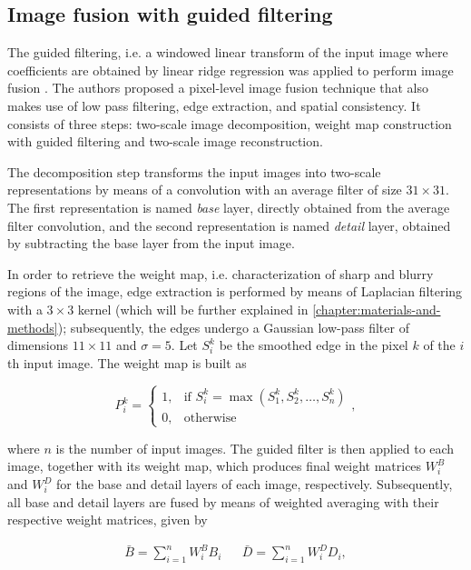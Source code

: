 \subsection{Image fusion with guided filtering}

The guided filtering, i.e. a windowed linear transform of the input image where coefficients are obtained by linear ridge regression was applied to perform image fusion \cite{li2013image}. The authors proposed a pixel-level image fusion technique that also makes use of low pass filtering, edge extraction, and spatial consistency. It consists of three steps: two-scale image decomposition, weight map construction with guided filtering and two-scale image reconstruction.

The decomposition step transforms the input images into two-scale representations by means of a convolution with an average filter of size $31 \times 31$. The first representation is named \emph{base} layer, directly obtained from the average filter convolution, and the second representation is named \emph{detail} layer, obtained by subtracting the base layer from the input image.

In order to retrieve the weight map, i.e. characterization of sharp and blurry regions of the image, edge extraction is performed by means of Laplacian filtering with a $3 \times 3$ kernel (which will be further explained in \autoref{chapter:materials-and-methods}); subsequently, the edges undergo a Gaussian low-pass filter of dimensions $11 \times 11$ and $\sigma = 5$. Let $S_{i}^{k}$ be the smoothed edge in the pixel $k$ of the $i$th input image. The weight map is built as

\begin{equation}
\label{eqn:weight_map}
P_{i}^{k} = 
    \begin{cases}
        1, & \text{if } S_{i}^{k} = \max{(S_{1}^{k},S_{2}^{k},\dots,S_{n}^{k})}\\
        0, & \text{otherwise}
    \end{cases},
\end{equation}

\noindent where $n$ is the number of input images. The guided filter is then applied to each image, together with its weight map, which produces final weight matrices $W_{i}^{B}$ and $W_{i}^{D}$ for the base and detail layers of each image, respectively. Subsequently, all base and detail layers are fused by means of weighted averaging with their respective weight matrices, given by

\begin{align}
\bar{B} = \sum_{i=1}^{n}W_{i}^{B}B_{i}
&&
\bar{D} = \sum_{i=1}^{n}W_{i}^{D}D_{i},
\end{align}

